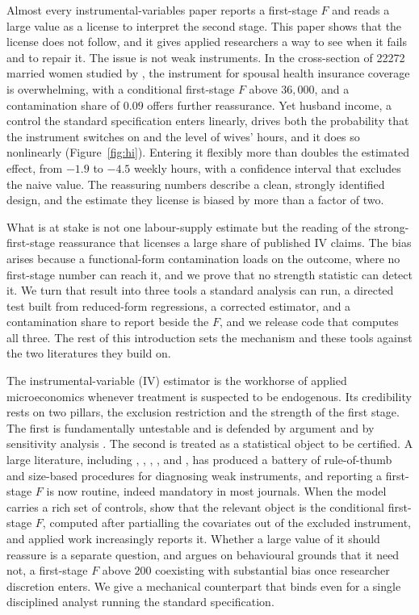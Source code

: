 \documentclass[preprint,11pt,authoryear]{elsarticle}
\theoremstyle{definition}
\begin{document}
Almost every instrumental-variables paper reports a first-stage $F$ and reads a large value as
a license to interpret the second stage. This paper shows that the license does not follow, and
it gives applied researchers a way to see when it fails and to repair it. The issue is not weak
instruments. In the cross-section of \num{22272} married women studied by \citet{olson1998},
the instrument for spousal health insurance coverage is overwhelming, with a conditional
first-stage $F$ above $36{,}000$, and a contamination share of $0.09$ offers further
reassurance. Yet husband income, a control the standard specification enters linearly, drives
both the probability that the instrument switches on and the level of wives' hours, and it does
so nonlinearly (Figure~\ref{fig:hi}). Entering it flexibly more than doubles the estimated
effect, from $-1.9$ to $-4.5$ weekly hours, with a confidence interval that excludes the naive
value. The reassuring numbers describe a clean, strongly identified design, and the estimate
they license is biased by more than a factor of two.

What is at stake is not one labour-supply estimate but the reading of the strong-first-stage
reassurance that licenses a large share of published IV claims. The bias arises because a
functional-form contamination loads on the outcome, where no first-stage number can reach it,
and we prove that no strength statistic can detect it. We turn that result into three tools a
standard analysis can run, a directed test built from reduced-form regressions, a corrected
estimator, and a contamination share to report beside the $F$, and we release code that
computes all three. The rest of this introduction sets the mechanism and these tools against
the two literatures they build on.

The instrumental-variable (IV) estimator is the workhorse of applied microeconomics
whenever treatment is suspected to be endogenous. Its credibility rests on two
pillars, the exclusion restriction and the strength of the first stage. The first is
fundamentally untestable and is defended by argument and by sensitivity analysis
\citep{conley2012,kippersluis2018}. The second is treated as a statistical object to
be certified. A large literature, including \citet{bound1995}, \citet{staiger1997},
\citet{stock2005}, \citet{montielolea2013}, and \citet{andrews2019}, has produced a
battery of rule-of-thumb and size-based procedures for diagnosing weak instruments,
and reporting a first-stage $F$ is now routine, indeed mandatory in most journals.
When the model carries a rich set of controls, \citet{sanderson2016} show that the
relevant object is the conditional first-stage $F$, computed after partialling
the covariates out of the excluded instrument, and applied work increasingly reports
it. Whether a large value of it should reassure is a separate question, and \citet{stevenson2026} argues on behavioural grounds that it need not, a first-stage $F$ above $200$ coexisting with substantial bias once researcher discretion enters. We give a mechanical counterpart that binds even for a single disciplined analyst running the standard specification.
\end{document}
